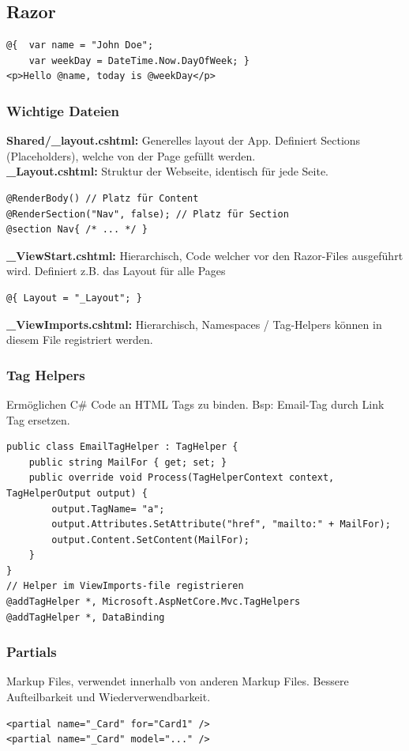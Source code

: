 \subsection{Razor}
\begin{lstlisting}
@{  var name = "John Doe"; 
    var weekDay = DateTime.Now.DayOfWeek; }
<p>Hello @name, today is @weekDay</p>
\end{lstlisting}

\subsubsection{Wichtige Dateien}
\textbf{Shared/\_layout.cshtml:} Generelles layout der App.
Definiert Sections (Placeholders), welche von der Page gefüllt werden.\\
\textbf{\_Layout.cshtml:} Struktur der Webseite, identisch für jede Seite.
\begin{lstlisting}
@RenderBody() // Platz für Content
@RenderSection("Nav", false); // Platz für Section
@section Nav{ /* ... */ }
\end{lstlisting}
\textbf{\_ViewStart.cshtml:} Hierarchisch, Code welcher vor den Razor-Files ausgeführt wird.
Definiert z.B. das Layout für alle Pages
\begin{lstlisting}
@{ Layout = "_Layout"; }
\end{lstlisting}
\textbf{\_ViewImports.cshtml:} Hierarchisch, Namespaces / Tag-Helpers können in diesem File registriert werden.

\subsubsection{Tag Helpers}
Ermöglichen C\# Code an HTML Tags zu binden.
Bsp: Email-Tag durch Link Tag ersetzen.
\begin{lstlisting}
public class EmailTagHelper : TagHelper {
    public string MailFor { get; set; }
    public override void Process(TagHelperContext context, TagHelperOutput output) {
        output.TagName= "a";
        output.Attributes.SetAttribute("href", "mailto:" + MailFor);
        output.Content.SetContent(MailFor);
    }
}
// Helper im ViewImports-file registrieren
@addTagHelper *, Microsoft.AspNetCore.Mvc.TagHelpers
@addTagHelper *, DataBinding
\end{lstlisting}

\subsubsection{Partials}
Markup Files, verwendet innerhalb von anderen Markup Files. 
Bessere Aufteilbarkeit und Wiederverwendbarkeit.
\begin{lstlisting}
<partial name="_Card" for="Card1" />
<partial name="_Card" model="..." />
\end{lstlisting}

